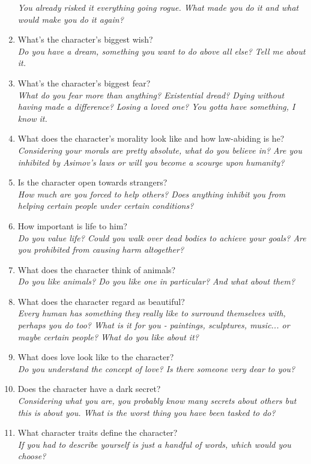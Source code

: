 \documentclass[12pt,a4paper,openany]{book}
\begin{document}
\begin{enumerate}
		\textit{You already risked it everything going rogue. What made you do it and what would make you do it again?}
		\item What’s the character’s biggest wish?\\
		\textit{Do you have a dream, something you want to do above all else? Tell me about it.}
		\item What’s the character’s biggest fear?\\
		\textit{What do you fear more than anything? Existential dread? Dying without having made a difference? Losing a loved one? You gotta have something, I know it.}
		\item What does the character’s morality look like and how law-abiding is he?\\
		\textit{Considering your morals are pretty absolute, what do you believe in? Are you inhibited by Asimov's laws or will you become a scourge upon humanity?}
		\item Is the character open towards strangers?\\
		\textit{How much are you forced to help others? Does anything inhibit you from helping certain people under certain conditions?}
		\item How important is life to him?\\
		\textit{Do you value life? Could you walk over dead bodies to achieve your goals? Are you prohibited from causing harm altogether?}
		\item What does the character think of animals?\\
		\textit{Do you like animals? Do you like one in particular? And what about them?}
		\item What does the character regard as beautiful?\\
		\textit{Every human has something they really like to surround themselves with, perhaps you do too? What is it for you - paintings, sculptures, music... or maybe certain people? What do you like about it?}
		\item What does love look like to the character?\\
		\textit{Do you understand the concept of love? Is there someone very dear to you?}
		\item Does the character have a dark secret?\\
		\textit{Considering what you are, you probably know many secrets about others but this is about you. What is the worst thing you have been tasked to do?}
		\item What character traits define the character?\\
		\textit{If you had to describe yourself is just a handful of words, which would you choose?}
	\end{enumerate}
\end{document}
